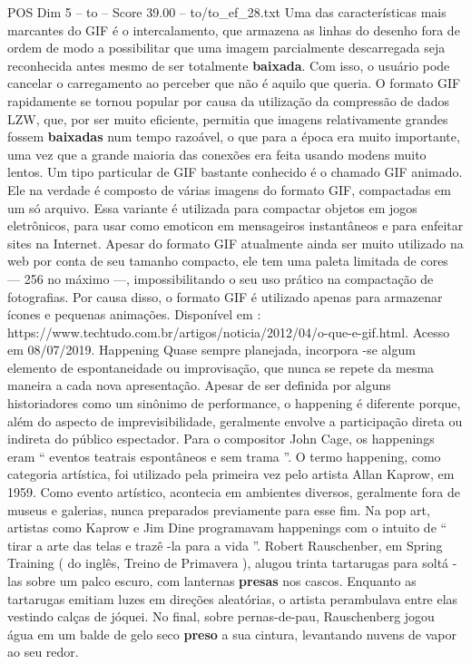 \begin{textsample}{POS Dim 5 – to – Score 39.00 – to/to\_ef\_28.txt}
Uma das características mais marcantes do GIF é o intercalamento, que armazena as linhas do desenho fora de ordem de modo a possibilitar que uma imagem parcialmente descarregada seja reconhecida antes mesmo de ser totalmente \textbf{baixada}.
Com isso, o usuário pode cancelar o carregamento ao perceber que não é aquilo que queria.
O formato GIF rapidamente se tornou popular por causa da utilização da compressão de dados LZW, que, por ser muito eficiente, permitia que imagens relativamente grandes fossem \textbf{baixadas} num tempo razoável, o que para a época era muito importante, uma vez que a grande maioria das conexões era feita usando modens muito lentos.
Um tipo particular de GIF bastante conhecido é o chamado GIF animado.
Ele na verdade é composto de várias imagens do formato GIF, compactadas em um só arquivo.
Essa variante é utilizada para compactar objetos em jogos eletrônicos, para usar como emoticon em mensageiros instantâneos e para enfeitar sites na Internet.
Apesar do formato GIF atualmente ainda ser muito utilizado na web por conta de seu tamanho compacto, ele tem uma paleta limitada de cores — 256 no máximo —, impossibilitando o seu uso prático na compactação de fotografias.
Por causa disso, o formato GIF é utilizado apenas para armazenar ícones e pequenas animações.
Disponível em : https://www.techtudo.com.br/artigos/noticia/2012/04/o-que-e-gif.html.
Acesso em 08/07/2019.
Happening Quase sempre planejada, incorpora -se algum elemento de espontaneidade ou improvisação, que nunca se repete da mesma maneira a cada nova apresentação.
Apesar de ser definida por alguns historiadores como um sinônimo de performance, o happening é diferente porque, além do aspecto de imprevisibilidade, geralmente envolve a participação direta ou indireta do público espectador.
Para o compositor John Cage, os happenings eram “ eventos teatrais espontâneos e sem trama ”.
O termo happening, como categoria artística, foi utilizado pela primeira vez pelo artista Allan Kaprow, em 1959.
Como evento artístico, acontecia em ambientes diversos, geralmente fora de museus e galerias, nunca preparados previamente para esse fim.
Na pop art, artistas como Kaprow e Jim Dine programavam happenings com o intuito de “ tirar a arte das telas e trazê -la para a vida ”.
Robert Rauschenber, em Spring Training ( do inglês, Treino de Primavera ), alugou trinta tartarugas para soltá -las sobre um palco escuro, com lanternas \textbf{presas} nos cascos.
Enquanto as tartarugas emitiam luzes em direções aleatórias, o artista perambulava entre elas vestindo calças de jóquei.
No final, sobre pernas-de-pau, Rauschenberg jogou água em um balde de gelo seco \textbf{preso} a sua cintura, levantando nuvens de vapor ao seu redor.

\end{textsample}
